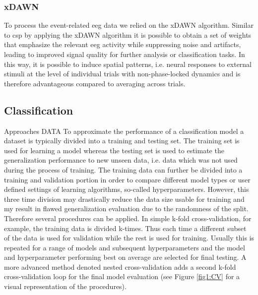 \subsubsection{xDAWN}
To process the event-related \gls{eeg} data we relied on the xDAWN algorithm. Similar to \gls{csp} by applying the xDAWN algorithm it is possible to obtain a set of weights that emphasize the relevant \gls{eeg} activity while suppressing noise and artifacts, leading to improved signal quality for further analysis or classification tasks. In this way, it is possible to induce spatial patterns, i.e. neural responses to external stimuli at the level of individual trials with non-phase-locked dynamics and is therefore advantageous compared to averaging across trials.\\

\subsection{Classification}
Approaches 
DATA
To approximate the performance of a classification model a dataset is typically divided into a training and testing set. The training set is used for learning a model whereas the testing set is used to estimate the generalization performance to new unseen data, i.e. data which was not used during the process of training. The training data can further be divided into a training and validation portion in order to compare different model types or user defined settings of learning algorithms, so-called hyperparameters. However, this three time division may drastically reduce the data size usable for training and my result in flawed generalization evaluation due to the randomness of the split. Therefore several procedures can be applied. In simple k-fold cross-validation, for example, the training data is divided k-times. Thus each time a different subset of the data is used for validation while the rest is used for training. Usually this is repeated for a range of models and subsequent hyperparameters and the model and hyperparameter performing best on average are selected for final testing. A more advanced method denoted nested cross-validation adds a second k-fold cross-validation loop for the final model evaluation (see Figure \ref{fig1:CV} for a visual representation of the procedures).    

